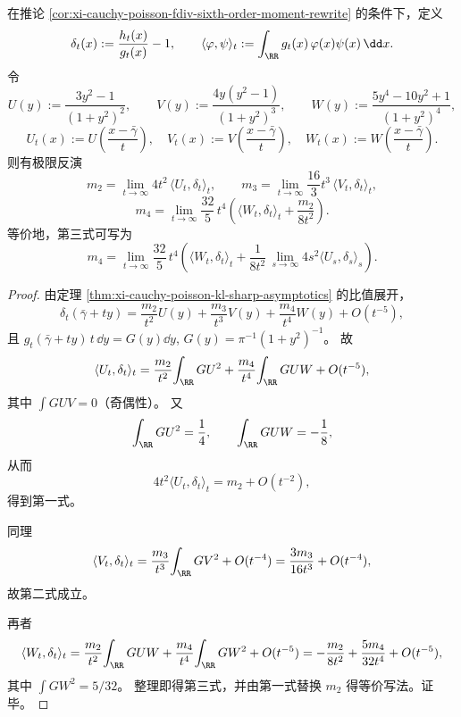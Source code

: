 \begin{theorem}[单尺度视界剖面的中心矩投影反演公式]\label{thm:xi-cauchy-poisson-single-scale-moment-inversion}
在推论 \ref{cor:xi-cauchy-poisson-fdiv-sixth-order-moment-rewrite} 的条件下，定义
\[
\delta_t(x):=\frac{h_t(x)}{g_t(x)}-1,
\qquad
\langle \varphi,\psi\rangle_t:=\int_{\RR} g_t(x)\,\varphi(x)\psi(x)\,\dd x.
\]
令
\[
U(y):=\frac{3y^2-1}{(1+y^2)^2},\qquad
V(y):=\frac{4y(y^2-1)}{(1+y^2)^3},\qquad
W(y):=\frac{5y^4-10y^2+1}{(1+y^2)^4},
\]
\[
U_t(x):=U\!\left(\frac{x-\bar\gamma}{t}\right),\quad
V_t(x):=V\!\left(\frac{x-\bar\gamma}{t}\right),\quad
W_t(x):=W\!\left(\frac{x-\bar\gamma}{t}\right).
\]
则有极限反演
\[
m_2=\lim_{t\to\infty}4t^2\,\langle U_t,\delta_t\rangle_t,
\qquad
m_3=\lim_{t\to\infty}\frac{16}{3}t^3\,\langle V_t,\delta_t\rangle_t,
\]
\[
m_4=\lim_{t\to\infty}\frac{32}{5}\,t^4
\left(\langle W_t,\delta_t\rangle_t+\frac{m_2}{8t^2}\right).
\]
等价地，第三式可写为
\[
m_4=
\lim_{t\to\infty}\frac{32}{5}\,t^4\left(
\langle W_t,\delta_t\rangle_t+\frac{1}{8t^2}\,\lim_{s\to\infty}4s^2\langle U_s,\delta_s\rangle_s
\right).
\]
\end{theorem}
\begin{proof}
由定理 \ref{thm:xi-cauchy-poisson-kl-sharp-asymptotics} 的比值展开，
\[
\delta_t(\bar\gamma+ty)=\frac{m_2}{t^2}U(y)+\frac{m_3}{t^3}V(y)+\frac{m_4}{t^4}W(y)+O(t^{-5}),
\]
且
\(
g_t(\bar\gamma+ty)\,t\,\dd y=G(y)\dd y
\),
\(
G(y)=\pi^{-1}(1+y^2)^{-1}
\)。
故
\[
\langle U_t,\delta_t\rangle_t
=\frac{m_2}{t^2}\!\int_{\RR}GU^2
+\frac{m_4}{t^4}\!\int_{\RR}GUW
+O(t^{-5}),
\]
其中 \(\int GUV=0\)（奇偶性）。
又
\[
\int_{\RR}GU^2=\frac14,\qquad \int_{\RR}GUW=-\frac18,
\]
从而
\[
4t^2\langle U_t,\delta_t\rangle_t=m_2+O(t^{-2}),
\]
得到第一式。

同理
\[
\langle V_t,\delta_t\rangle_t
=\frac{m_3}{t^3}\!\int_{\RR}GV^2+O(t^{-4})
=\frac{3m_3}{16t^3}+O(t^{-4}),
\]
故第二式成立。

再者
\[
\langle W_t,\delta_t\rangle_t
=\frac{m_2}{t^2}\!\int_{\RR}GUW+\frac{m_4}{t^4}\!\int_{\RR}GW^2+O(t^{-5})
=-\frac{m_2}{8t^2}+\frac{5m_4}{32t^4}+O(t^{-5}),
\]
其中 \(\int GW^2=5/32\)。
整理即得第三式，并由第一式替换 \(m_2\) 得等价写法。证毕。
\end{proof}

\endinput
